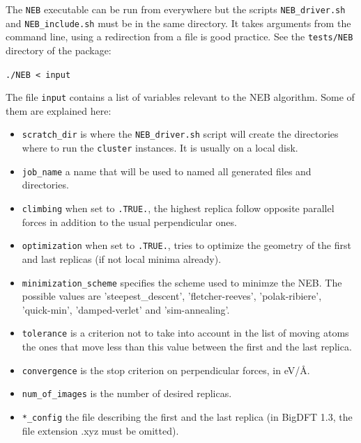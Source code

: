 \documentclass[a4paper,11pt]{report}
\begin{document}
The \texttt{NEB} executable can be run from everywhere but the scripts \texttt{NEB\_driver.sh} and \texttt{NEB\_include.sh} must be in the same directory. It takes arguments from the command line, using a redirection from a file is good practice. See the \texttt{tests/NEB} directory of the package:
\begin{center}
  \texttt{./NEB < input}
\end{center}
The file \texttt{input} contains a list of variables relevant to the NEB algorithm. Some of them are explained here:
\begin{itemize}
  \item \texttt{scratch\_dir} is where the \texttt{NEB\_driver.sh} script will create the directories where to run the \texttt{cluster} instances. It is usually on a local disk.
  \item \texttt{job\_name} a name that will be used to named all generated files and directories.
  \item \texttt{climbing} when set to \texttt{.TRUE.}, the highest replica follow opposite parallel forces in addition to the usual perpendicular ones.
  \item \texttt{optimization} when set to \texttt{.TRUE.}, tries to optimize the geometry of the first and last replicas (if not local minima already).
  \item \texttt{minimization\_scheme} specifies the scheme used to minimze the NEB. The possible values are 'steepest\_descent', 'fletcher-reeves', 'polak-ribiere', \hfill\\ 'quick-min', 'damped-verlet' and 'sim-annealing'.
  \item \texttt{tolerance} is a criterion not to take into account in the list of moving atoms the ones that move less than this value between the first and the last replica.
  \item \texttt{convergence} is the stop criterion on perpendicular forces, in eV/\AA.
  \item \texttt{num\_of\_images} is the number of desired replicas.
  \item \texttt{*\_config} the file describing the first and the last replica (in BigDFT 1.3, the file extension .xyz must be omitted).
\end{itemize}
\end{document}
